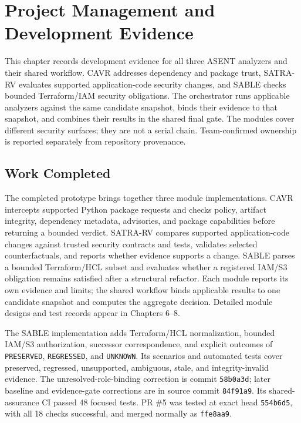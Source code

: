 \chapter{Project Management and Development Evidence}

This chapter records development evidence for all three ASENT analyzers and their shared workflow. CAVR addresses dependency and package trust, SATRA-RV evaluates supported application-code security changes, and SABLE checks bounded Terraform/IAM security obligations. The orchestrator runs applicable analyzers against the same candidate snapshot, binds their evidence to that snapshot, and combines their results in the shared final gate. The modules cover different security surfaces; they are not a serial chain. Team-confirmed ownership is reported separately from repository provenance.

\section{Work Completed}

The completed prototype brings together three module implementations. CAVR intercepts supported Python package requests and checks policy, artifact integrity, dependency metadata, advisories, and package capabilities before returning a bounded verdict. SATRA-RV compares supported application-code changes against trusted security contracts and tests, validates selected counterfactuals, and reports whether evidence supports a change. SABLE parses a bounded Terraform/HCL subset and evaluates whether a registered IAM/S3 obligation remains satisfied after a structural refactor. Each module reports its own evidence and limits; the shared workflow binds applicable results to one candidate snapshot and computes the aggregate decision. Detailed module designs and test records appear in Chapters 6--8.

The SABLE implementation adds Terraform/HCL normalization, bounded IAM/S3 authorization, successor correspondence, and explicit outcomes of \texttt{PRESERVED}, \texttt{REGRESSED}, and \texttt{UNKNOWN}. Its scenarios and automated tests cover preserved, regressed, unsupported, ambiguous, stale, and integrity-invalid evidence. The unresolved-role-binding correction is commit \texttt{58b0a3d}; later baseline and evidence-gate corrections are in source commit \texttt{84f91a9}. Its shared-assurance CI passed 48 focused tests. PR \#5 was tested at exact head \texttt{554b6d5}, with all 18 checks successful, and merged normally as \texttt{ffe8aa9}.

